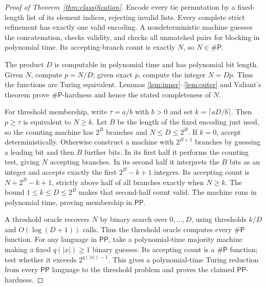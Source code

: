 \documentclass[11pt]{article}
\newcommand{\PP}{\mathsf{PP}}
\newcommand{\sharpP}{\mathsf{\#P}}
\begin{document}
\begin{proof}[Proof of Theorem~\ref{thm:classification}]
Encode every tie permutation by a fixed-length list of its element
indices, rejecting invalid lists. Every complete strict refinement has
exactly one valid encoding. A nondeterministic machine guesses the
concatenation, checks validity, and checks all unmatched pairs for
blocking in polynomial time. Its accepting-branch count is exactly $N$,
so $N\in\sharpP$.

The product $D$ is computable in polynomial time and has polynomial
bit length. Given $N$, compute $p=N/D$; given exact $p$, compute the
integer $N=Dp$. Thus the functions are Turing equivalent. Lemmas
\ref{lem:inner}--\ref{lem:outer} and Valiant's theorem prove
$\sharpP$-hardness and hence the stated completeness of $N$.

For threshold membership, write $\tau=a/b$ with $b>0$ and set
$k=\lceil aD/b\rceil$. Then $p\geq\tau$ is equivalent to $N\geq k$.
Let $B$ be the length of the fixed encoding just used, so the counting
machine has $2^B$ branches and $N\leq D\leq2^B$.
If $k=0$, accept deterministically.
Otherwise construct a machine with $2^{B+1}$ branches by guessing a
leading bit and then $B$ further bits. In its first half it performs the
counting test, giving $N$ accepting branches.
In its second half it interprets the $B$ bits as an integer and accepts
exactly the first $2^B-k+1$ integers. Its accepting count is
$N+2^B-k+1$, strictly above half of all branches exactly when $N\geq k$.
The bound $1\leq k\leq D\leq2^B$ makes that second-half count valid.
The machine runs in polynomial time, proving membership in $\PP$.

A threshold oracle recovers $N$ by binary search over $0,\ldots,D$,
using thresholds $k/D$ and $O(\log(D+1))$ calls.
Thus the threshold oracle computes every $\sharpP$ function.
For any language in $\PP$, take a polynomial-time majority machine
making a fixed $q(|x|)\geq1$ binary guesses.
Its accepting count is a $\sharpP$ function; test whether it exceeds
$2^{q(|x|)-1}$. This gives a polynomial-time Turing
reduction from every $\PP$ language to the threshold problem and proves
the claimed $\PP$-hardness.
\end{proof}
\end{document}

